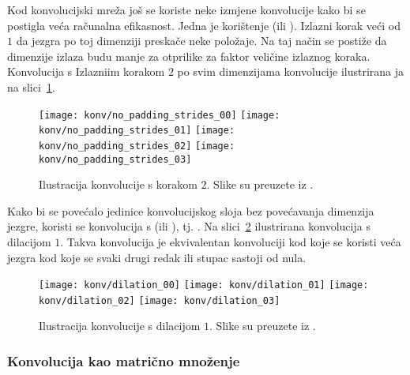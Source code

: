 \documentclass[utf8, diplomski, lmodern]{fer}
\begin{document}
Kod konvolucijski mreža još se koriste neke izmjene konvolucije kako bi se postigla veća računalna efikasnost. Jedna je korištenje  (ili ). Izlazni korak veći od $1$ da jezgra po toj dimenziji preskače neke položaje. Na taj način se postiže da dimenzije izlaza budu manje za otprilike za faktor veličine izlaznog koraka. Konvolucija s Izlazniim korakom $2$ po svim dimenzijama konvolucije ilustrirana ja na slici~\ref{fig:konvolucija-izl-korak}. 

\begin{figure}
	\centering
	\texttt{[image: konv/no\_padding\_strides\_00]}
	\texttt{[image: konv/no\_padding\_strides\_01]}
	\texttt{[image: konv/no\_padding\_strides\_02]}
	\texttt{[image: konv/no\_padding\_strides\_03]}
	\caption{Ilustracija konvolucije s korakom $2$. Slike su preuzete iz \citet{Dumoulin:2016:GCADL}.}
	\label{fig:konvolucija-izl-korak}
\end{figure}

Kako bi se povećalo  jedinice konvolucijskog sloja bez povećavanja dimenzija jezgre, koristi se konvolucija s  (ili ), tj. . Na slici~\ref{fig:konvolucija-dilatacija} ilustrirana konvolucija s dilacijom $1$. Takva konvolucija je ekvivalentan konvoluciji kod koje se koristi veća jezgra kod koje se svaki drugi redak ili stupac sastoji od nula.

\begin{figure}
	\centering
	\texttt{[image: konv/dilation\_00]}
	\texttt{[image: konv/dilation\_01]}
	\texttt{[image: konv/dilation\_02]}
	\texttt{[image: konv/dilation\_03]}
	\caption{Ilustracija konvolucije s dilacijom $1$. Slike su preuzete iz \citet{Dumoulin:2016:GCADL}.}
	\label{fig:konvolucija-dilatacija}
\end{figure}

\subsubsection{Konvolucija kao matrično množenje}
\end{document}
